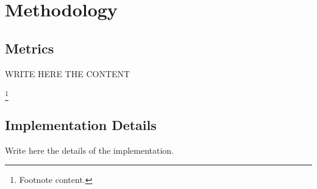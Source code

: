 
\chapter{Methodology}\label{ch:methodology}

\bigskip 
\bigskip




\bigskip

\section{Metrics}

\bigskip

WRITE HERE THE CONTENT

\bigskip 

\bigskip



\bigskip 

\bigskip

\footnote{ Footnote content.}



\bigskip
\begin{comment}
\section{Name of the section}

bla
bla
bla

\end{comment}
\bigskip
\bigskip
\bigskip

\section{Implementation Details}


Write here the details of the implementation.


\bigskip
\bigskip
\bigskip



